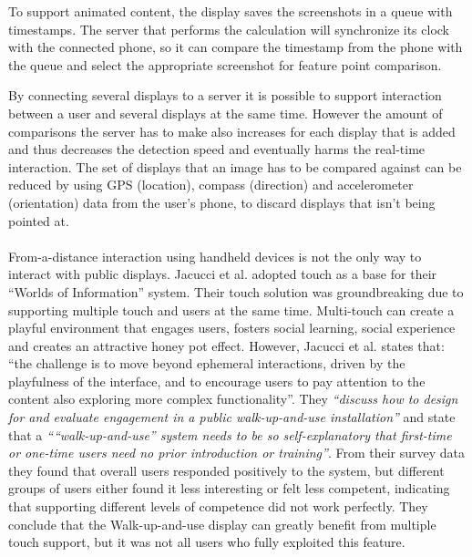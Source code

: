 To support animated content, the display saves the screenshots in a queue with timestamps. The server that performs the calculation will synchronize its clock with the connected phone, so it can compare the timestamp from the phone with the queue and select the appropriate screenshot for feature point comparison.

By connecting several displays  to a server it is possible to support interaction between a user and several displays at the same time. However the amount of comparisons the server has to make also increases for each display that is added and thus decreases the detection speed and eventually harms the real-time interaction. The set of displays that an image has to be compared against can be reduced by using GPS (location), compass (direction) and accelerometer (orientation) data from the user's phone, to discard displays that isn't being pointed at. %
\\\\
From-a-distance interaction using handheld devices is not the only way to interact with public displays. %
Jacucci et al. adopted touch as a base for their ``Worlds of Information'' system. Their touch solution was groundbreaking due to supporting multiple touch and users at the same time. Multi-touch can create a playful environment that engages users, fosters social learning, social experience and creates an attractive honey pot effect. However, Jacucci et al. states that: ``the challenge is to move beyond ephemeral interactions, driven by the playfulness of 
the interface, and to encourage users to pay attention to the content also exploring more complex functionality''\cite{Jacucci:2010}.
They \emph{``discuss how to design for and evaluate engagement in a public walk-up-and-use installation''} and state that a \emph{````walk-up-and-use'' system needs to be so self-explanatory that first-time or one-time users need no prior introduction or training''}\cite{Jacucci:2010}. %
From their survey data they found that overall users responded positively to the system, but different groups of users either found it less interesting or felt less competent, indicating that supporting different levels of competence did not work perfectly. They conclude that the Walk-up-and-use display can greatly benefit from multiple touch support, but it was not all users who fully exploited this feature.


